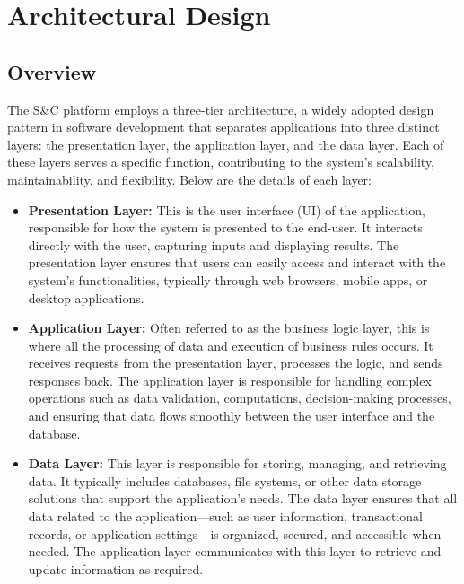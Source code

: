 \chapter{Architectural Design}

\section{Overview}

The S\&C platform employs a three-tier architecture, a widely adopted design pattern in software development that separates applications into three distinct layers: the presentation layer, the application layer, and the data layer. Each of these layers serves a specific function, contributing to the system’s scalability, maintainability, and flexibility. Below are the details of each layer:

\begin{itemize}
    \item \textbf{Presentation Layer:}  
    This is the user interface (UI) of the application, responsible for how the system is presented to the end-user. It interacts directly with the user, capturing inputs and displaying results. The presentation layer ensures that users can easily access and interact with the system’s functionalities, typically through web browsers, mobile apps, or desktop applications.

    \item \textbf{Application Layer:}  
    Often referred to as the business logic layer, this is where all the processing of data and execution of business rules occurs. It receives requests from the presentation layer, processes the logic, and sends responses back. The application layer is responsible for handling complex operations such as data validation, computations, decision-making processes, and ensuring that data flows smoothly between the user interface and the database.

    \item \textbf{Data Layer:}  
    This layer is responsible for storing, managing, and retrieving data. It typically includes databases, file systems, or other data storage solutions that support the application’s needs. The data layer ensures that all data related to the application—such as user information, transactional records, or application settings—is organized, secured, and accessible when needed. The application layer communicates with this layer to retrieve and update information as required.
\end{itemize}

